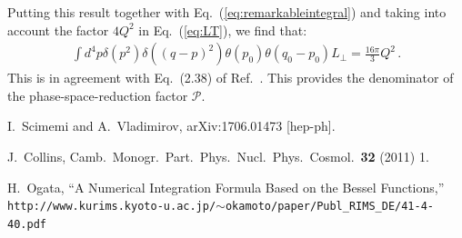 \documentclass[10pt,a4paper]{article}
\begin{document}
Putting this result together with Eq.~(\ref{eq:remarkableintegral})
and taking into account the factor $4Q^2$ in Eq.~(\ref{eq:LT}), we find
that:
\begin{equation}
\begin{array}{l}
  \displaystyle \int d^4p \delta(p^2) \delta((q-p)^2) \theta(p_{0})
  \theta(q_0-p_{0})L_\perp = \frac{16\pi}{3}Q^2\,.
\end{array}
\end{equation}
This is in agreement with Eq.~(2.38) of
Ref.~\cite{Scimemi:2017etj}. This provides the denominator of the
phase-space-reduction factor $\mathcal{P}$.%





\newpage

\begin{thebibliography}{alp}

  I.~Scimemi and A.~Vladimirov,
  arXiv:1706.01473 [hep-ph].

  J.~Collins,
  Camb.\ Monogr.\ Part.\ Phys.\ Nucl.\ Phys.\ Cosmol.\  {\bf 32} (2011) 1.

  H.~Ogata,
  ``A Numerical Integration Formula Based on the Bessel Functions,''
  \texttt{http://www.kurims.kyoto-u.ac.jp/$\sim$okamoto/paper/Publ\_RIMS\_DE/41-4-40.pdf}

\end{thebibliography}
\end{document}
